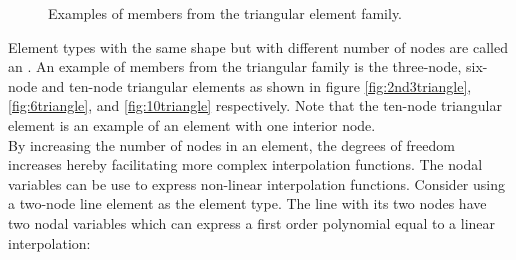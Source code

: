 \begin{figure}
  \centering
  \hspace{10mm}
  \hspace{10mm}
  \caption{Examples of members from the triangular element family.}
  \label{fig:triangle-element-family}
\end{figure}

Element types with the same shape but with different number of nodes
are called an . An example of members from the
triangular family is the three-node, six-node and ten-node triangular
elements as shown in figure \ref{fig:2nd3triangle},
\ref{fig:6triangle}, and \vref{fig:10triangle} respectively. Note that
the ten-node triangular element is an example of an element with one
interior node. \\

By increasing the number of nodes in an element, the degrees of
freedom increases hereby facilitating more complex interpolation
functions. The nodal variables can be use
to express non-linear interpolation functions. Consider using a
two-node line element as the element type. The line with its two nodes
have two nodal variables which can express a first order polynomial
equal to a linear interpolation:

